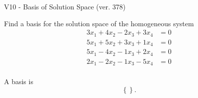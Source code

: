 \begin{exercise}
  \begin{exerciseTitle}V10 - Basis of Solution Space (ver. 378)\end{exerciseTitle}
  \begin{exerciseStatement}
    Find a basis for the solution space of the homogeneous system 
\begin{align*}
 3 x_ 1 + 4 x_ 2 -2 x_ 3 + 3 x_ 4 &= 0  \\ 
  5 x_ 1 + 5 x_ 2 + 3 x_ 3 + 1 x_ 4 &= 0  \\ 
  5 x_ 1 -4 x_ 2 -1 x_ 3 + 2 x_ 4 &= 0  \\ 
  2 x_ 1 -2 x_ 2 -1 x_ 3 -5 x_ 4 &= 0  \\ 
 \end{align*}


 
  \end{exerciseStatement}

  \begin{exerciseAnswer}
   A basis is   
\[\left\{\right\}.\]

  


  \end{exerciseAnswer}
\end{exercise}